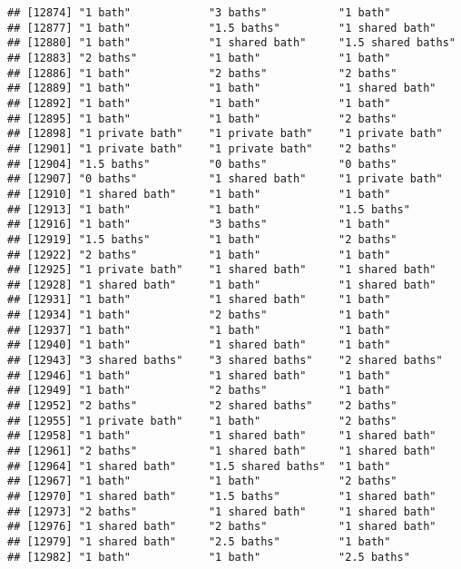 \documentclass[
]{article}
\begin{document}
\begin{verbatim}
## [12874] "1 bath"            "3 baths"           "1 bath"           
## [12877] "1 bath"            "1.5 baths"         "1 shared bath"    
## [12880] "1 bath"            "1 shared bath"     "1.5 shared baths" 
## [12883] "2 baths"           "1 bath"            "1 bath"           
## [12886] "1 bath"            "2 baths"           "2 baths"          
## [12889] "1 bath"            "1 bath"            "1 shared bath"    
## [12892] "1 bath"            "1 bath"            "1 bath"           
## [12895] "1 bath"            "1 bath"            "2 baths"          
## [12898] "1 private bath"    "1 private bath"    "1 private bath"   
## [12901] "1 private bath"    "1 private bath"    "2 baths"          
## [12904] "1.5 baths"         "0 baths"           "0 baths"          
## [12907] "0 baths"           "1 shared bath"     "1 private bath"   
## [12910] "1 shared bath"     "1 bath"            "1 bath"           
## [12913] "1 bath"            "1 bath"            "1.5 baths"        
## [12916] "1 bath"            "3 baths"           "1 bath"           
## [12919] "1.5 baths"         "1 bath"            "2 baths"          
## [12922] "2 baths"           "1 bath"            "1 bath"           
## [12925] "1 private bath"    "1 shared bath"     "1 shared bath"    
## [12928] "1 shared bath"     "1 bath"            "1 shared bath"    
## [12931] "1 bath"            "1 shared bath"     "1 bath"           
## [12934] "1 bath"            "2 baths"           "1 bath"           
## [12937] "1 bath"            "1 bath"            "1 bath"           
## [12940] "1 bath"            "1 shared bath"     "1 bath"           
## [12943] "3 shared baths"    "3 shared baths"    "2 shared baths"   
## [12946] "1 bath"            "1 shared bath"     "1 bath"           
## [12949] "1 bath"            "2 baths"           "1 bath"           
## [12952] "2 baths"           "2 shared baths"    "2 baths"          
## [12955] "1 private bath"    "1 bath"            "2 baths"          
## [12958] "1 bath"            "1 shared bath"     "1 shared bath"    
## [12961] "2 baths"           "1 shared bath"     "1 shared bath"    
## [12964] "1 shared bath"     "1.5 shared baths"  "1 bath"           
## [12967] "1 bath"            "1 bath"            "2 baths"          
## [12970] "1 shared bath"     "1.5 baths"         "1 shared bath"    
## [12973] "2 baths"           "1 shared bath"     "1 shared bath"    
## [12976] "1 shared bath"     "2 baths"           "1 shared bath"    
## [12979] "1 shared bath"     "2.5 baths"         "1 bath"           
## [12982] "1 bath"            "1 bath"            "2.5 baths"        

\end{verbatim}
\end{document}
